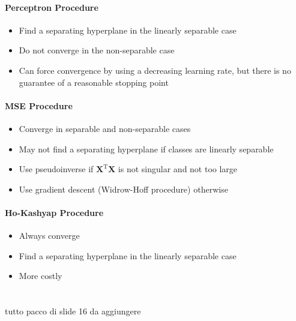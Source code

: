 \documentclass[11pt,a4paper]{article}
\theoremstyle{definition}
\theoremstyle{plain}
\theoremstyle{remark}
\begin{document}
\begin{tcolorbox}[colback=purple!5!white,colframe=purple!75!black,title=\textbf{Comparison of Methods}]

\subsection*{Perceptron Procedure}
\begin{itemize}
    \item Find a separating hyperplane in the linearly separable case
    \item Do not converge in the non-separable case
    \item Can force convergence by using a decreasing learning rate, but there is no guarantee of a reasonable stopping point
\end{itemize}

\subsection*{MSE Procedure}
\begin{itemize}
    \item Converge in separable and non-separable cases
    \item May not find a separating hyperplane if classes are linearly separable
    \item Use pseudoinverse if $\mathbf{X}^{\mathrm{T}}\mathbf{X}$ is not singular and not too large
    \item Use gradient descent (Widrow-Hoff procedure) otherwise
\end{itemize}

\subsection*{Ho-Kashyap Procedure}
\begin{itemize}
    \item Always converge
    \item Find a separating hyperplane in the linearly separable case
    \item More costly
\end{itemize}
\end{tcolorbox}




\newpage 

\part{}

\section{}


tutto pacco di slide 16 da aggiungere
\end{document}
